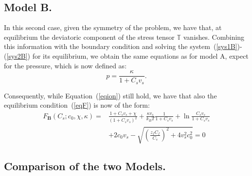 \documentclass[runningheads]{llncs}
\begin{document}
\subsection{Model B.}
In this second case, given the symmetry of the problem, we have that, at equilibrium the deviatoric component of the stress tensor $\mathbb{T}$ vanishes. Combining this information with the boundary condition and solving the system~(\ref{sys1B})-(\ref{sys2B}) for its equilibrium, we obtain the same equations as for model A, expect for the pressure, which is now defined as:
\begin{equation}
p= \frac{\kappa}{1+C_s v_s}.
\end{equation}

Consequently, while Equation~(\ref{eqion}) still hold, we have that also the equilibrium condition~(\ref{eqF}) is now of the form:
\begin{equation}
\begin{aligned}
F_{\mathbf{B}}(C_s; c_0,\chi,\kappa)=&\frac{1+C_sv_s+\chi}{(1+C_sv_s)^2}+\frac{\kappa v_s}{k_BT} \frac{1}{1+C_sv_s}+\ln \frac{C_sv_s}{1+C_sv_s}\\[1.5mm]
& +2c_0v_s-\sqrt{\left(\frac{z_fC_f}{C_s}\right)^2+4v_s^2c^2_0} =0 \label{eqFb}
\end{aligned}
\end{equation}
\subsection{Comparison of the two Models.}
\end{document}
